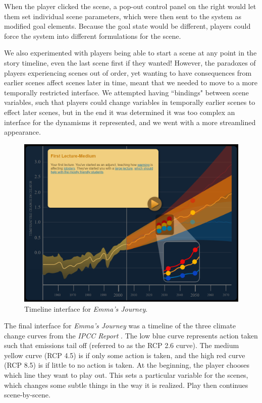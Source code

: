 
When the player clicked the scene, a pop-out control panel on the right would let them set individual scene parameters, which were then sent to the system as modified goal elements. Because the goal state would be different, players could force the system into different formulations for the scene. 

We also experimented with players being able to start a scene at any point in the story timeline, even the last scene first if they wanted! However, the paradoxes of players experiencing scenes out of order, yet wanting to have consequences from earlier scenes affect scenes later in time, meant that we needed to move to a more temporally restricted interface. We attempted having ``bindings" between scene variables, such that players could change variables in temporally earlier scenes to effect later scenes, but in the end it was determined it was too complex an interface for the dynamisms it represented, and we went with a more streamlined appearance.


\begin{figure}
    \centering
    \includegraphics[width=12cm]{figures/3-StoryAssembler/scene-ui.png}
    \caption{Timeline interface for \textit{Emma's Journey}.}
    \label{fig:scene-ui}
\end{figure}


The final interface for \textit{Emma's Journey} was a timeline of the three climate change curves from the \textit{IPCC Report} \cite{ipcc}. The low blue curve represents action taken such that emissions tail off (referred to as the RCP 2.6 curve). The medium yellow curve (RCP 4.5) is if only some action is taken, and the high red curve (RCP 8.5) is if little to no action is taken. At the beginning, the player chooses which line they want to play out. This sets a particular variable for the scenes, which changes some subtle things in the way it is realized. Play then continues scene-by-scene. 

